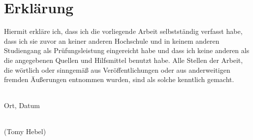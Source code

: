 \chapter*{Erklärung}

Hiermit erkläre ich, dass ich die vorliegende Arbeit selbstständig verfasst habe, 
dass ich sie zuvor an keiner anderen Hochschule und in keinem anderen Studiengang 
als Prüfungsleistung eingereicht habe und dass ich keine anderen als die angegebenen 
Quellen und Hilfsmittel benutzt habe. Alle Stellen der Arbeit, die wörtlich oder sinngemäß
 aus Veröffentlichungen oder aus anderweitigen fremden Äußerungen entnommen wurden,
sind als solche kenntlich gemacht. 
\vspace*{5cm}

\noindent
\begin{minipage}[H]{0.4\linewidth}
  \begin{center}
    \dotfill\\
    Ort, Datum
  \end{center}
\end{minipage}
\hspace*{0.1\linewidth}
\begin{minipage}[H]{0.5\linewidth}
  \begin{center}
    \dotfill\\
    (Tomy Hebel)
  \end{center}
\end{minipage}

\vspace{1.5cm}
